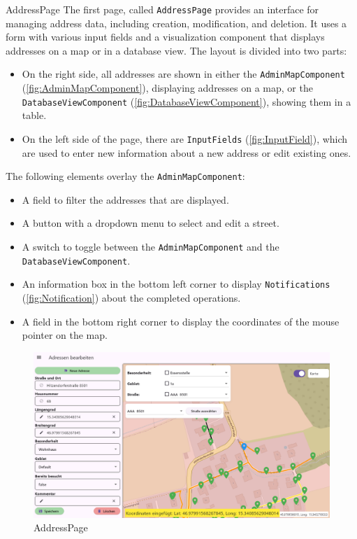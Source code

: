 \begin{subsection}{AddressPage}
    \sloppy
    The first page, called \texttt{AddressPage} provides an interface for managing address data, including creation, modification, and deletion. It uses a form with various input fields and a visualization component that displays addresses on a map or in a database view. The layout is divided into two parts:

    \begin{itemize}
        \item On the right side, all addresses are shown in either the \texttt{AdminMapComponent} (\ref{fig:AdminMapComponent}), displaying addresses on a map, or the \texttt{DatabaseViewComponent} (\ref{fig:DatabaseViewComponent}), showing them in a table.
        \item On the left side of the page, there are \texttt{InputFields} (\ref{fig:InputField}), which are used to enter new information about a new address or edit existing ones.
    \end{itemize}

    \newpage

    The following elements overlay the \texttt{AdminMapComponent}:

    \begin{itemize}
        \item A field to filter the addresses that are displayed.
        \item A button with a dropdown menu to select and edit a street.
        \item A switch to toggle between the \texttt{AdminMapComponent} and the \texttt{DatabaseViewComponent}.
        \item An information box in the bottom left corner to display \texttt{Notifications} (\ref{fig:Notification}) about the completed operations.
        \item A field in the bottom right corner to display the coordinates of the mouse pointer on the map.
    \end{itemize}
    

    \begin{figure}[H]
        \centering
        \includegraphics[width=1\linewidth]{images/AdminPanel/AddressPage.png}
        \caption{AddressPage}
    \end{figure}
\end{subsection}

